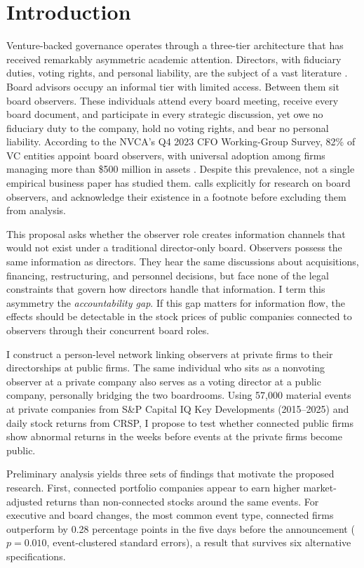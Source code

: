 \section{Introduction}
\label{sec:intro}

Venture-backed governance operates through a three-tier architecture that has received remarkably asymmetric academic attention. Directors, with fiduciary duties, voting rights, and personal liability, are the subject of a vast literature \cite{hermalin2003boards,adams2010role}. Board advisors occupy an informal tier with limited access. Between them sit board observers. These individuals attend every board meeting, receive every board document, and participate in every strategic discussion, yet owe no fiduciary duty to the company, hold no voting rights, and bear no personal liability. According to the NVCA's Q4 2023 CFO Working-Group Survey, 82\% of VC entities appoint board observers, with universal adoption among firms managing more than \$500 million in assets \cite{packin2025board}. Despite this prevalence, not a single empirical business paper has studied them.  calls explicitly for research on board observers, and  acknowledge their existence in a footnote before excluding them from analysis.

This proposal asks whether the observer role creates information channels that would not exist under a traditional director-only board. Observers possess the same information as directors. They hear the same discussions about acquisitions, financing, restructuring, and personnel decisions, but face none of the legal constraints that govern how directors handle that information. I term this asymmetry the \textit{accountability gap}. If this gap matters for information flow, the effects should be detectable in the stock prices of public companies connected to observers through their concurrent board roles.

I construct a person-level network linking observers at private firms to their directorships at public firms. The same individual who sits as a nonvoting observer at a private company also serves as a voting director at a public company, personally bridging the two boardrooms. Using 57,000 material events at private companies from S\&P Capital IQ Key Developments (2015--2025) and daily stock returns from CRSP, I propose to test whether connected public firms show abnormal returns in the weeks before events at the private firms become public.

Preliminary analysis yields three sets of findings that motivate the proposed research. First, connected portfolio companies appear to earn higher market-adjusted returns than non-connected stocks around the same events. For executive and board changes, the most common event type, connected firms outperform by 0.28 percentage points in the five days before the announcement ($p=0.010$, event-clustered standard errors), a result that survives six alternative specifications.

